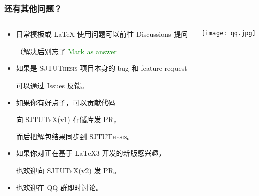 \begin{frame}
  \frametitle{还有其他问题？}
  \begin{columns}
    \begin{column}{0.75\textwidth}
    \begin{itemize}
      \item[{\faComment*[regular]}] 日常模板或 \LaTeX{} 使用问题可以前往 Discussions  提问
      
      （解决后别忘了 \textcolor{green}{\faCheckCircle{} Mark as answer}
      \item[{\faDotCircle[regular]}] 如果是 \textsc{SJTUThesis} 项目本身的 bug 和 feature request
      
      可以通过 Issues  反馈。
      \item[{\faCodeBranch}] 如果你有好点子，可以贡献代码
     
      向 \textsc{SJTU\TeX{}}(v1)  存储库发 PR，\par
      而后把解包结果同步到 \textsc{SJTUThesis}。
  
      \item[{\faTag}] 如果你对正在基于 \LaTeX3 开发的新版感兴趣，\par
      也欢迎向 \textsc{SJTU\TeX{}}(v2)  发 PR。
  
      \item[{\faQq}] 也欢迎在 QQ 群即时讨论。
    \end{itemize}
    \end{column}
    \begin{column}{0.25\textwidth}
      \texttt{[image: qq.jpg]}
    \end{column}
  \end{columns}
\end{frame}